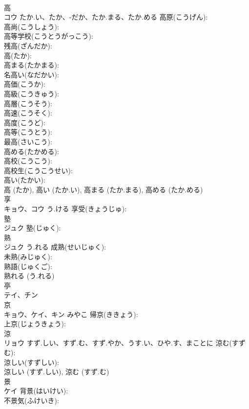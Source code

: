 \documentclass[8pt]{extreport}
\begin{document}
\begin{CJK}{UTF8}{min}
\\	高		
\\	コウ	たか.い、たか、-だか、たか.まる、たか.める	高原(こうげん): 
\\	高尚(こうしょう): 
\\	高等学校(こうとうがっこう): 
\\	残高(ざんだか): 
\\	高(たか): 
\\	高まる(たかまる): 
\\	名高い(なだかい): 
\\	高価(こうか): 
\\	高級(こうきゅう): 
\\	高層(こうそう): 
\\	高速(こうそく): 
\\	高度(こうど): 
\\	高等(こうとう): 
\\	最高(さいこう): 
\\	高める(たかめる): 
\\	高校(こうこう): 
\\	高校生(こうこうせい): 
\\	高い(たかい): 
\\	高 (たか), 高い (たか.い), 高まる (たか.まる), 高める (たか.める)
\\	享			
\\	キョウ、コウ	う.ける	享受(きょうじゅ): 
\\	塾			
\\	ジュク		塾(じゅく): 
\\	熟			
\\	ジュク	う.れる	成熟(せいじゅく): 
\\	未熟(みじゅく): 
\\	熟語(じゅくご): 
\\	熟れる (う.れる)
\\	亭			
\\	テイ、チン			
\\	京			
\\	キョウ、ケイ、キン	みやこ	帰京(ききょう): 
\\	上京(じょうきょう): 
\\	涼			
\\	リョウ	すず.しい、すず.む、すず.やか、うす.い、ひや.す、まことに	涼む(すずむ): 
\\	涼しい(すずしい): 
\\	涼しい (すず.しい), 涼む (すず.む)
\\	景			
\\	ケイ		背景(はいけい): 
\\	不景気(ふけいき): 

\end{CJK}
\end{document}
